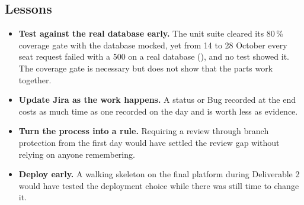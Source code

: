 \subsection{Lessons}
\begin{itemize}
  \item \textbf{Test against the real database early.} The unit suite cleared its 80\,\% coverage gate with
    the database mocked, yet from 14 to 28 October every seat request failed with a 500 on a real database
    (), and no test showed it. The coverage gate is necessary but does not show that the parts work
    together.
  \item \textbf{Update Jira as the work happens.} A status or Bug recorded at the end costs as much time as one
    recorded on the day and is worth less as evidence.
  \item \textbf{Turn the process into a rule.} Requiring a review through branch protection from the first day
    would have settled the review gap without relying on anyone remembering.
  \item \textbf{Deploy early.} A walking skeleton on the final platform during Deliverable 2 would have tested
    the deployment choice while there was still time to change it.
\end{itemize}
